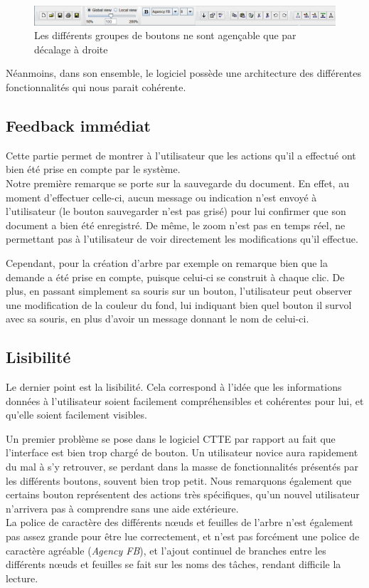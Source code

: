 \documentclass[12pt, a4paper]{article}
\begin{document}
\begin{figure}[h]
\begin{center}
   \includegraphics[scale = 0.5]{agencement.jpg}
	\caption{Les différents groupes de boutons ne sont agençable que par décalage à droite}
	\end{center}
\end{figure}


Néanmoins, dans son ensemble, le logiciel possède une architecture des différentes fonctionnalités qui nous parait cohérente.  

\subsection{Feedback immédiat}
Cette partie permet de montrer à l'utilisateur que les actions qu'il a effectué ont bien été prise en compte par le système.\\


Notre première remarque se porte sur la sauvegarde du document. En effet, au moment d'effectuer celle-ci, aucun message ou indication n'est envoyé à l'utilisateur (le bouton sauvegarder n'est pas grisé) pour lui confirmer que son document a bien été enregistré. De même, le zoom n'est pas en temps réel, ne permettant pas à l'utilisateur de voir directement les modifications qu'il effectue. 


Cependant, pour la création d'arbre par exemple on remarque bien que la demande a été prise en compte, puisque celui-ci se construit à chaque clic. De plus, en passant simplement sa souris sur un bouton, l'utilisateur peut observer une modification de la couleur du fond, lui indiquant bien quel bouton il survol avec sa souris, en plus d'avoir un message donnant le nom de celui-ci.

\subsection{Lisibilité}
Le dernier point est la lisibilité. Cela correspond à l'idée que les informations données à l’utilisateur soient facilement compréhensibles et cohérentes pour lui, et qu'elle soient facilement visibles.


Un premier problème se pose dans le logiciel CTTE par rapport au fait que l'interface est bien trop chargé de bouton. Un utilisateur novice aura rapidement du mal à s'y retrouver, se perdant dans la masse de fonctionnalités présentés par les différents boutons, souvent bien trop petit. Nous remarquons également que certains bouton représentent des actions très spécifiques, qu'un nouvel utilisateur n'arrivera pas à comprendre sans une aide extérieure.\\ 
La police de caractère des différents nœuds et feuilles de l'arbre n'est également pas assez grande pour être lue correctement, et n'est pas forcément une police de caractère agréable (\emph{Agency FB}), et l'ajout continuel de branches entre les différents nœuds et feuilles se fait sur les noms des tâches, rendant difficile la lecture. 
\end{document}
